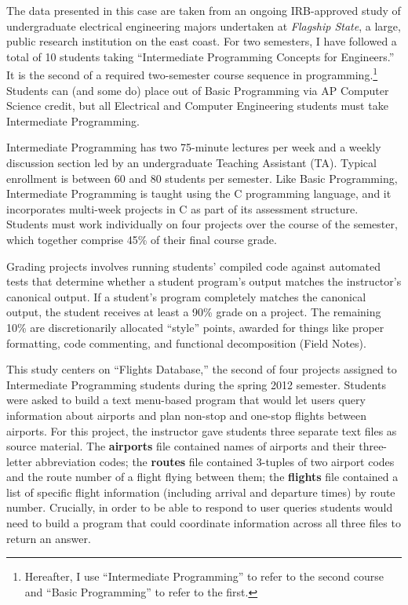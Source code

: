 The data presented in this case are taken from an ongoing IRB-approved
study of undergraduate electrical engineering majors undertaken at
\emph{Flagship State}, a large, public research institution on the east
coast. For two semesters, I have followed a total of 10 students taking
``Intermediate Programming Concepts for Engineers.'' It is the second of
a required two-semester course sequence in programming.\footnote{Hereafter,
  I use ``Intermediate Programming'' to refer to the second course and
  ``Basic Programming'' to refer to the first.} Students can (and some
do) place out of Basic Programming via AP Computer Science credit, but
all Electrical and Computer Engineering students must take Intermediate
Programming.

Intermediate Programming has two 75-minute lectures per week and a
weekly discussion section led by an undergraduate Teaching Assistant
(TA). Typical enrollment is between 60 and 80 students per semester.
Like Basic Programming, Intermediate Programming is taught using the C
programming language, and it incorporates multi-week projects in C as
part of its assessment structure. Students must work individually on
four projects over the course of the semester, which together comprise
45\% of their final course grade.

Grading projects involves running students' compiled code against
automated tests that determine whether a student program's output
matches the instructor's canonical output. If a student's program
completely matches the canonical output, the student receives at least a
90\% grade on a project. The remaining 10\% are discretionarily
allocated ``style'' points, awarded for things like proper formatting,
code commenting, and functional decomposition (Field Notes).

This study centers on ``Flights Database,'' the second of four projects
assigned to Intermediate Programming students during the spring 2012
semester. Students were asked to build a text menu-based program that
would let users query information about airports and plan non-stop and
one-stop flights between airports. For this project, the instructor gave
students three separate text files as source material. The
\textbf{airports} file contained names of airports and their
three-letter abbreviation codes; the \textbf{routes} file contained
3-tuples of two airport codes and the route number of a flight flying
between them; the \textbf{flights} file contained a list of specific
flight information (including arrival and departure times) by route
number. Crucially, in order to be able to respond to user queries
students would need to build a program that could coordinate information
across all three files to return an answer.

